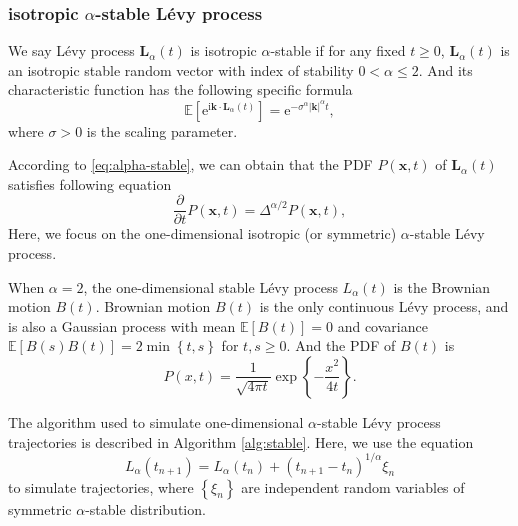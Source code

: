 \documentclass[aps, pre, preprint, amsmath, amssymb]{revtex4}
\newcommand{\e}{\mathrm{e}}
\newcommand{\I}{\mathrm{i}}
\newcommand{\E}{\mathbb{E}}
\newcommand{\zhongkuo}[1]{\left[#1\right]}
\newcommand{\dakuo}[1]{\left\{#1\right\}}
\begin{document}
\subsubsection{isotropic $\alpha$-stable L\'{e}vy process}
We say L\'{e}vy process $\bm{L}_{\alpha}(t)$ is isotropic $\alpha$-stable if for any fixed $t\geqslant 0$, $\bm{L}_{\alpha}(t)$ is an isotropic stable random vector with index of stability $0<\alpha\leqslant 2$. 
And its characteristic function has the following specific formula 
\begin{equation}\label{eq:alpha-stable}
\E\zhongkuo{\e^{\I\bm{k}\cdot\bm{L}_{\alpha}(t)}}=\e^{-\sigma^{\alpha}|\bm{k}|^{\alpha}t},
\end{equation}
where $\sigma >0$ is the scaling parameter. 

According to \eqref{eq:alpha-stable}, we can obtain that the PDF $P(\bm{x},t)$ of $\bm{L}_{\alpha}(t)$ satisfies following equation
\begin{equation}
	\frac{\partial}{\partial t}P(\bm{x},t)={\Delta}^{\alpha/2}P(\bm{x}, t),
\end{equation}
Here, we focus on the one-dimensional isotropic (or symmetric) $\alpha$-stable L\'{e}vy process.

When $\alpha=2$, the one-dimensional stable L\'{e}vy process ${L}_{\alpha}(t)$ is the Brownian motion ${B}(t)$. 
Brownian motion $B(t)$ is the only continuous L\'{e}vy process, and is also a Gaussian process with mean $\E\zhongkuo{B(t)}=0$ and covariance $\E\zhongkuo{B(s)B(t)}=2\min\dakuo{t, s}$ for $t, s \geqslant 0$. 
And the PDF of $B(t)$ is
\begin{equation}
P(x,t)=\frac{1}{\sqrt{4\pi t}}\exp{\dakuo{-\frac{x^2}{4t}}}.
\end{equation}

The algorithm used to simulate one-dimensional $\alpha$-stable L\'{e}vy process trajectories is described in Algorithm \ref{alg:stable}.
Here, we use the equation 
\begin{equation}\label{eq:euler1}
	L_{\alpha}(t_{n+1})=L_{\alpha}(t_n)+(t_{n+1}-t_n)^{1/\alpha}\xi_n
\end{equation}
to simulate trajectories, where $\dakuo{\xi_n}$ are independent random variables of symmetric $\alpha$-stable distribution.
\end{document}
